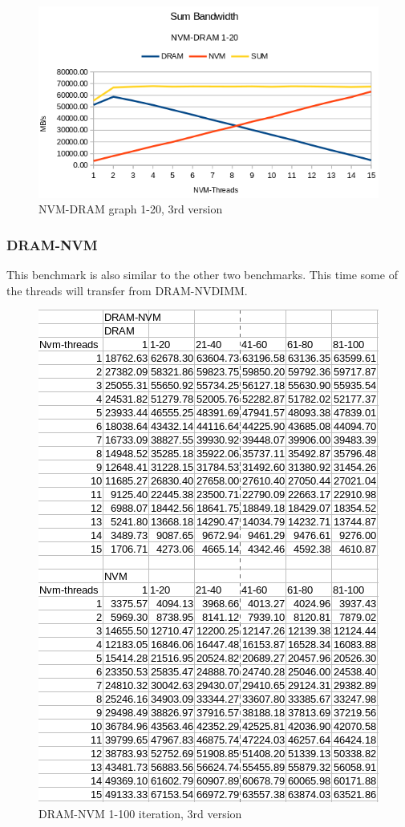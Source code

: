 \documentclass[12pt,a4paper,USenglish]{article}      %
\begin{document}
\begin{figure}[!hbtp]
\includegraphics[scale=0.7]{NVM-DRAM_Graph_1-20_v3}
\caption{NVM-DRAM graph 1-20, 3rd version}
\end{figure}

\clearpage
\subsubsection{DRAM-NVM}
This benchmark is also similar to the other two benchmarks. This time some of the threads will transfer from DRAM-NVDIMM.
\begin{figure}[!hbtp]
\includegraphics[scale=0.7]{DRAM-NVM_table_p1_1-100_v3}
\caption{DRAM-NVM 1-100 iteration, 3rd version}
\end{figure}
\end{document}

